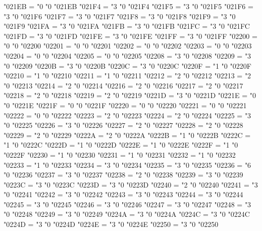 \Umathcode "021EB = "0 "0 "021EB
\Umathcode "021F4 = "3 "0 "021F4
\Umathcode "021F5 = "3 "0 "021F5
\Umathcode "021F6 = "3 "0 "021F6
\Umathcode "021F7 = "3 "0 "021F7
\Umathcode "021F8 = "3 "0 "021F8
\Umathcode "021F9 = "3 "0 "021F9
\Umathcode "021FA = "3 "0 "021FA
\Umathcode "021FB = "3 "0 "021FB
\Umathcode "021FC = "3 "0 "021FC
\Umathcode "021FD = "3 "0 "021FD
\Umathcode "021FE = "3 "0 "021FE
\Umathcode "021FF = "3 "0 "021FF
\Umathcode "02200 = "0 "0 "02200
\Umathcode "02201 = "0 "0 "02201
\Umathcode "02202 = "0 "0 "02202
\Umathcode "02203 = "0 "0 "02203
\Umathcode "02204 = "0 "0 "02204
\Umathcode "02205 = "0 "0 "02205
\Umathcode "02208 = "3 "0 "02208
\Umathcode "02209 = "3 "0 "02209
\Umathcode "0220B = "3 "0 "0220B
\Umathcode "0220C = "3 "0 "0220C
\Umathcode "0220F = "1 "0 "0220F
\Umathcode "02210 = "1 "0 "02210
\Umathcode "02211 = "1 "0 "02211
\Umathcode "02212 = "2 "0 "02212
\Umathcode "02213 = "2 "0 "02213
\Umathcode "02214 = "2 "0 "02214
\Umathcode "02216 = "2 "0 "02216
\Umathcode "02217 = "2 "0 "02217
\Umathcode "02218 = "2 "0 "02218
\Umathcode "02219 = "2 "0 "02219
\Umathcode "0221D = "3 "0 "0221D
\Umathcode "0221E = "0 "0 "0221E
\Umathcode "0221F = "0 "0 "0221F
\Umathcode "02220 = "0 "0 "02220
\Umathcode "02221 = "0 "0 "02221
\Umathcode "02222 = "0 "0 "02222
\Umathcode "02223 = "2 "0 "02223
\Umathcode "02224 = "2 "0 "02224
\Umathcode "02225 = "3 "0 "02225
\Umathcode "02226 = "3 "0 "02226
\Umathcode "02227 = "2 "0 "02227
\Umathcode "02228 = "2 "0 "02228
\Umathcode "02229 = "2 "0 "02229
\Umathcode "0222A = "2 "0 "0222A
\Umathcode "0222B = "1 "0 "0222B
\Umathcode "0222C = "1 "0 "0222C
\Umathcode "0222D = "1 "0 "0222D
\Umathcode "0222E = "1 "0 "0222E
\Umathcode "0222F = "1 "0 "0222F
\Umathcode "02230 = "1 "0 "02230
\Umathcode "02231 = "1 "0 "02231
\Umathcode "02232 = "1 "0 "02232
\Umathcode "02233 = "1 "0 "02233
\Umathcode "02234 = "3 "0 "02234
\Umathcode "02235 = "3 "0 "02235
\Umathcode "02236 = "6 "0 "02236
\Umathcode "02237 = "3 "0 "02237
\Umathcode "02238 = "2 "0 "02238
\Umathcode "02239 = "3 "0 "02239
\Umathcode "0223C = "3 "0 "0223C
\Umathcode "0223D = "3 "0 "0223D
\Umathcode "02240 = "2 "0 "02240
\Umathcode "02241 = "3 "0 "02241
\Umathcode "02242 = "3 "0 "02242
\Umathcode "02243 = "3 "0 "02243
\Umathcode "02244 = "3 "0 "02244
\Umathcode "02245 = "3 "0 "02245
\Umathcode "02246 = "3 "0 "02246
\Umathcode "02247 = "3 "0 "02247
\Umathcode "02248 = "3 "0 "02248
\Umathcode "02249 = "3 "0 "02249
\Umathcode "0224A = "3 "0 "0224A
\Umathcode "0224C = "3 "0 "0224C
\Umathcode "0224D = "3 "0 "0224D
\Umathcode "0224E = "3 "0 "0224E
\Umathcode "02250 = "3 "0 "02250
